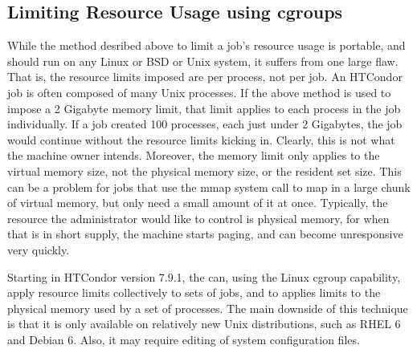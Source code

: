 \subsection{\label{sec:Resource-Limits-Cgroup}Limiting Resource Usage using cgroups} 

While the method desribed above to limit a job's resource usage is portable,
and should run on any Linux or BSD or Unix system, it suffers from one
large flaw.  That is, the resource limits imposed are per process, not per job.
An HTCondor job is often composed of many Unix processes.  If the above 
method is used to impose a 2 Gigabyte memory limit, that limit applies to
each process in the job individually.  If a job created 100 processes, each just under 2 Gigabytes, the job would continue without the resource limits 
kicking in.  Clearly, this is not what the machine owner intends.  Moreover,
the memory limit only applies to the virtual memory size, not the physical
memory size, or the resident set size.  This can be a problem for jobs
that use the mmap system call to map in a large chunk of virtual memory, but
only need a small amount of it at once.  Typically, the resource the
administrator would like to control is physical memory, for when that is in
short supply, the machine starts paging, and can become unresponsive very
quickly.

Starting in HTCondor version 7.9.1, the  can, using the 
Linux cgroup capability, apply resource limits collectively
to sets of jobs, and to applies limits to the physical memory used by a set
of processes.  The main downside of this technique is that it is only 
available on relatively new Unix distributions, such as RHEL 6 and Debian 6.
Also, it may require editing of system configuration files.


